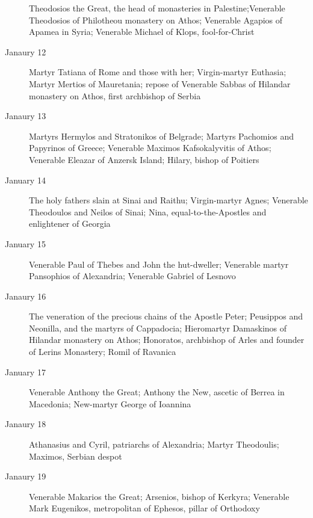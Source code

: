 \begin{description}
Theodosios the Great, the head of monasteries in Palestine;Venerable Theodosios of Philotheou monastery on Athos; Venerable Agapios of Apamea in Syria; Venerable Michael of Klops, fool-for-Christ

\item[Janaury 12]

Martyr Tatiana of Rome and those with her; Virgin-martyr Euthasia; Martyr Mertios of Mauretania; repose of Venerable Sabbas of Hilandar monastery on Athos, first archbishop of Serbia

\item[Janaury 13]

Martyrs Hermylos and Stratonikos of Belgrade; Martyrs Pachomios and Papyrinos of Greece; Venerable Maximos Kafsokalyvitis of Athos; Venerable Eleazar of Anzersk Island; Hilary, bishop of Poitiers

\item[January 14]

The holy fathers slain at Sinai and Raithu; Virgin-martyr Agnes; Venerable Theodoulos and Neilos of Sinai; Nina, equal-to-the-Apostles and enlightener of Georgia

\item[January 15]

Venerable Paul of Thebes and John the hut-dweller; Venerable martyr Pansophios of Alexandria; Venerable Gabriel of Lesnovo

\item[Janaury 16]

The veneration of the precious chains of the Apostle Peter; Peusippos and Neonilla, and the martyrs of Cappadocia; Hieromartyr Damaskinos of Hilandar monastery on Athos; Honoratos, archbishop of Arles and founder of Lerins Monastery; Romil of Ravanica

\item[January 17]

Venerable Anthony the Great; Anthony the New, ascetic of Berrea in Macedonia; New-martyr George of Ioannina

\item[Janaury 18]

Athanasius and Cyril, patriarchs of Alexandria; Martyr Theodoulis; Maximos, Serbian despot

\item[Janaury 19]

Venerable Makarios the Great; Arsenios, bishop of Kerkyra; Venerable Mark Eugenikos, metropolitan of Ephesos, pillar of Orthodoxy


\end{description}
